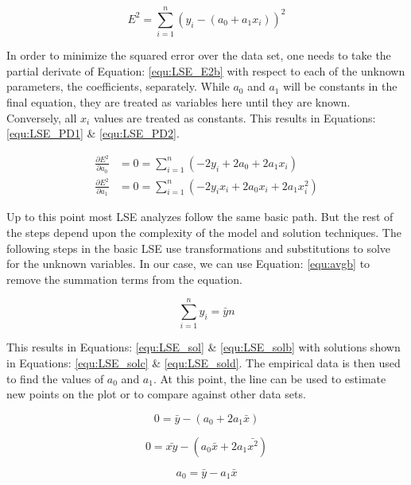 \begin{equation}
    \label{equ:LSE_E2b}
    E^2 = \sum_{i=1}^{n} (y_i - (a_0 + a_1 x_i))^2
\end{equation}

In order to minimize the squared error over the data set, one needs to take the partial derivate of Equation: \eqref{equ:LSE_E2b} with respect to each of the unknown parameters, the coefficients, separately. While $a_0$ and $a_1$ will be constants in the final equation, they are treated as variables here until they are known. Conversely, all $x_i$ values are treated as constants. This results in Equations: \eqref{equ:LSE_PD1} \& \eqref{equ:LSE_PD2}.

\begin{align} 
    \frac{\partial E^2}{\partial a_0} &= 0 = \sum_{i=1}^{n} (-2y_i +2a_0 + 2a_1 x_i)           \label{equ:LSE_PD1} \\
    \frac{\partial E^2}{\partial a_1} &= 0 = \sum_{i=1}^{n} (-2y_i x_i +2a_0 x_i + 2a_1 x_i^2) \label{equ:LSE_PD2}
\end{align}

Up to this point most LSE analyzes follow the same basic path. But the rest of the steps depend upon the complexity of the model and solution techniques. The following steps in the basic LSE use transformations and substitutions to solve for the unknown variables. In our case, we can use Equation: \eqref{equ:avgb} to remove the summation terms from the equation.

\begin{equation}
    \label{equ:avgb} 
    \sum_{i=1}^{n} y_i  = \bar{y}n
\end{equation}

This results in Equations: \eqref{equ:LSE_sol} \& \eqref{equ:LSE_solb} with solutions shown in Equations: \eqref{equ:LSE_solc} \& \eqref{equ:LSE_sold}. The empirical data is then used to find the values of $a_0$ and $a_1$. At this point, the line can be used to estimate new points on the plot or to compare against other data sets.

\begin{equation}
    \label{equ:LSE_sol}
    0 = \bar{y} - (a_0 + 2a_1 \bar{x})
\end{equation}

\begin{equation}
    \label{equ:LSE_solb}
    0 = \bar{xy} - (a_0 \bar{x} + 2a_1 \bar{x^2})
\end{equation}

\begin{equation}
    \label{equ:LSE_solc}
    a_0 = \bar{y} - a_1 \bar{x}
\end{equation}

